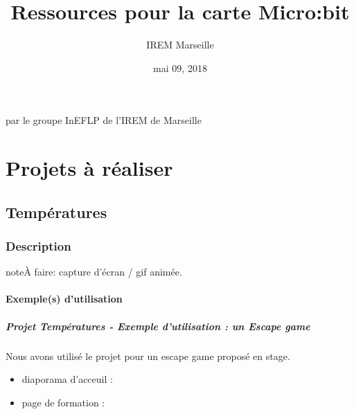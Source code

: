 \documentclass[letterpaper,10pt,french]{sphinxmanual}
\title{Ressources pour la carte Micro:bit}
\date{mai 09, 2018}
\author{IREM Marseille}
\begin{document}
\maketitle
\sphinxtableofcontents
{}\label{\detokenize{index::doc}}


par le groupe InEFLP de l’IREM de Marseille


\chapter{Projets à réaliser}
\label{\detokenize{index:documentation-micro-bit}}\label{\detokenize{index:projets-a-realiser}}

\section{Températures}
\label{\detokenize{projets/temperature:projettemp}}\label{\detokenize{projets/temperature::doc}}\label{\detokenize{projets/temperature:temperatures}}

\subsection{Description}
\label{\detokenize{projets/temperature:description}}
\begin{sphinxadmonition}{note}{\label{projets/temperature:index-0}À faire:}
capture d’écran / gif animée.
\end{sphinxadmonition}


\subsubsection{Exemple(s) d’utilisation}
\label{\detokenize{projets/temperature:exemple-s-d-utilisation}}

\paragraph{Projet Températures - Exemple d’utilisation : un Escape game}
\label{\detokenize{projets/temperature-exemple-escape::doc}}\label{\detokenize{projets/temperature-exemple-escape:projet-projettemp-exemple-d-utilisation-un-escape-game}}
Nous avons utilisé le projet {\hyperref[\detokenize{projets/temperature:projettemp}]{}} pour un escape game proposé en stage.
\begin{itemize}
\item {} 
diaporama d’acceuil : 

\item {} 
page de formation : 

\end{itemize}
\end{document}
